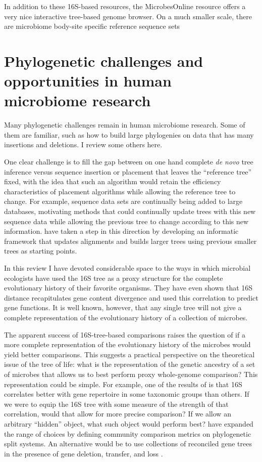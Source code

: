 \documentclass{amsart}
\begin{document}
In addition to these 16S-based resources, the MicrobesOnline resource \citep{dehal2010microbesonline} offers a very nice interactive tree-based genome browser.
On a much smaller scale, there are microbiome body-site specific reference sequence sets \citep{chen2010human,griffen2011core,srinivasan2012bacterial}


\section{Phylogenetic challenges and opportunities in human microbiome research}

Many phylogenetic challenges remain in human microbiome research.
Some of them are familiar, such as how to build large phylogenies on data that has many insertions and deletions.
I review some others here.

One clear challenge is to fill the gap between on one hand complete \emph{de novo} tree inference versus sequence insertion or placement that leaves the ``reference tree'' fixed, with the idea that such an algorithm would retain the efficiency characteristics of placement algorithms while allowing the reference tree to change.
For example, sequence data sets are continually being added to large databases, motivating methods that could continually update trees with this new sequence data while allowing the previous tree to change according to this new information.
\citet{Izquierdo-Carrasco2014-hu} have taken a step in this direction by developing an informatic framework that updates alignments and builds larger trees using previous smaller trees as starting points.

In this review I have devoted considerable space to the ways in which microbial ecologists have used the 16S tree as a proxy structure for the complete evolutionary history of their favorite organisms.
They have even shown that 16S distance recapitulates gene content divergence and used this correlation to predict gene functions.
It is well known, however, that any single tree will not give a complete representation of the evolutionary history of a collection of microbes.

The apparent success of 16S-tree-based comparisons raises the question of if a more complete representation of the evolutionary history of the microbes would yield better comparisons.
This suggests a practical perspective on the theoretical issue of the tree of life: what is the representation of the genetic ancestry of a set of microbes that allows us to best perform proxy whole-genome comparison?
This representation could be simple.
For example, one of the results of \citet{zaneveld2010ribosomal} is that 16S correlates better with gene repertoire in some taxonomic groups than others.
If we were to equip the 16S tree with some measure of the strength of that correlation, would that allow for more precise comparison?
If we allow an arbitrary ``hidden'' object, what such object would perform best?
\citet{Parks2012-os} have expanded the range of choices by defining community comparison metrics on phylogenetic split systems.
An alternative would be to use collections of reconciled gene trees in the presence of gene deletion, transfer, and loss \citep[e.g.][]{szollHosi2013efficient,szollHosi2013lateral}.
\end{document}
